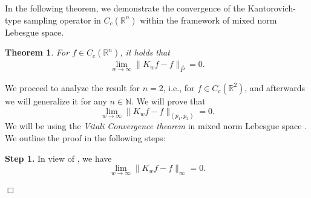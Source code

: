 \documentclass[11pt, a4paper]{article}
\newtheorem{thm}{Theorem}[section]
\theoremstyle{definition}
\newcommand{\qedwhite}{\hfill \ensuremath{\Box}}
\renewenvironment{proof}{{\raggedright \bfseries Proof.}}{\qedwhite}
\numberwithin{equation}{section}
\def\NN{\mathbb N}
\def\RR{\mathbb R}
\begin{document}
In the following theorem, we demonstrate the convergence of the Kantorovich-type sampling operator in $C_{c}(\RR^{n})$ within the framework of mixed norm Lebesgue space.
\begin{thm} \label{thm 4.3}
	For $f\in C_{c}(\RR^{n})$, it holds that
	\begin{align*}
		\lim_{w\to\infty}\|K_{w}f-f\|_{\overrightarrow P}=0.
		\end{align*}
	\end{thm}
\begin{proof}
We proceed to analyze the result for $n=2$, i.e., for $f \in  C_{c}(\RR^{2})$, and afterwards we will generalize it for any $n \in \NN.$  We will prove that	$$\lim_{w\to\infty}\|K_{w}f-f\|_{(p_1,p_2)}=0.$$ We will be using the \emph{Vitali Convergence theorem} in mixed norm Lebesgue space \cite{vitali}. We outline the proof in the following steps:\par

\textbf{Step 1.} In view of  \cite[Theorem 4.1]{multi}, we have	$$\lim_{w\to\infty}\|K_{w}f-f\|_{\infty}=0.$$\par 


\end{proof}
\end{document}
